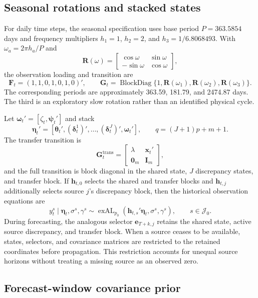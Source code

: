 \subsection{Seasonal rotations and stacked states}
\label{env:app:stackedstates}

For daily time steps, the seasonal specification uses base period
$P=363.5854$ days and frequency multipliers $h_1=1$, $h_2=2$, and
$h_3=1/6.8068493$. With $\omega_a=2\pi h_a/P$ and
\[
\mathbf R(\omega)=
\begin{bmatrix}
\cos\omega&\sin\omega\\
-\sin\omega&\cos\omega
\end{bmatrix},
\]
the observation loading and transition are
\[
\mathbf F_t=(1,1,0,1,0,1,0)',\qquad
\mathbf G_t=\operatorname{BlockDiag}
\{1,\mathbf R(\omega_1),\mathbf R(\omega_2),\mathbf R(\omega_3)\}.
\]
The corresponding periods are approximately 363.59, 181.79, and 2474.87
days. The third is an exploratory slow rotation rather than an identified
physical cycle.

Let $\boldsymbol\omega_t'=[\zeta_t,\boldsymbol\psi_t']$ and stack
\[
\boldsymbol\eta_t'=
[\boldsymbol\theta_t',(\boldsymbol\delta_t^1)',\ldots,
(\boldsymbol\delta_t^J)',\boldsymbol\omega_t'],
\qquad q=(J+1)p+m+1.
\]
The transfer transition is
\[
\mathbf G_t^{\mathrm{trans}}=
\begin{bmatrix}
\lambda&\mathbf x_t'\\
\mathbf 0_m&\mathbf I_m
\end{bmatrix},
\]
and the full transition is block diagonal in the shared state, $J$
discrepancy states, and transfer block. If $\mathbf h_{t,0}$ selects the
shared and transfer blocks and $\mathbf h_{t,j}$ additionally selects source
$j$'s discrepancy block, then the historical observation equations are
\[
y_t^s\mid\boldsymbol\eta_t,\sigma^s,\gamma^s
\sim\operatorname{exAL}_{p_0}
(\mathbf h_{t,s}'\boldsymbol\eta_t,\sigma^s,\gamma^s),
\qquad s\in\mathcal J_0.
\]
During forecasting, the analogous selector $\mathbf e_{T+k,j}$ retains the
shared state, active source discrepancy, and transfer block. When a source
ceases to be available, states, selectors, and covariance matrices are
restricted to the retained coordinates before propagation. This restriction
accounts for unequal source horizons without treating a missing source as an
observed zero.

\subsection{Forecast-window covariance prior}
\label{env:app:forecastcovariance}

